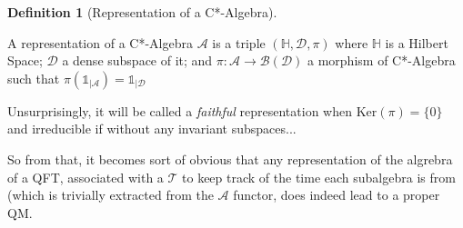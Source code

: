 \documentclass[a4paper,11pt]{article}
\numberwithin{equation}{section}
\theoremstyle{definition}
\newtheorem{definition}{Definition}
\newtheorem{comment}{Comment}
\begin{document}
\begin{definition}[Representation of a C*-Algebra]$\quad$

    A representation of a C*-Algebra $\mathcal{A}$ is a triple $(\mathbb{H},\mathcal{D},\pi)$ where $\mathbb{H}$ is a Hilbert Space; $\mathcal{D}$ a dense subspace of it; and $\pi : \mathcal{A}\to\mathcal{B}(\mathcal{D})$ a morphism of C*-Algebra such that $\pi(\mathds{1}_{|\mathcal{A}})=\mathds{1}_{|\mathcal{D}}$

    
    Unsurprisingly, it will be called a \emph{faithful} representation when $\mathrm{Ker}(\pi)=\{0\}$ and irreducible if without any invariant subspaces...
    
    So from that, it becomes sort of obvious that any representation of the algrebra of a QFT, associated with a $\mathcal{T}$ to keep track of the time each subalgebra is from (which is trivially extracted from the $\mathcal{A}$ functor, does indeed lead to a proper QM.
\end{definition}

\end{document}

